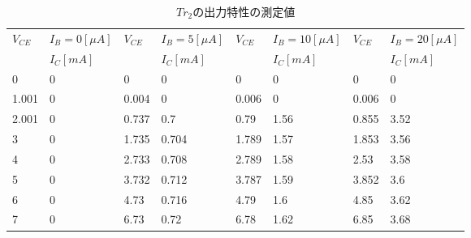 \documentclass[10pt, a4j, dvipdfmx]{jarticle}
\begin{document}
    \begin{table}[H]
        \centering
        \caption{$Tr_2$の出力特性の測定値}
        \label{tbl:5}
        \small
        \begin{tabular}{|l|l|l|l|l|l|l|l|}
        \hline
        \multirow{2}{*}{$V_{CE}$} & $I_B=0[\mu A]$ & \multirow{2}{*}{$V_{CE}$} & $I_B=5[\mu A]$ & \multirow{2}{*}{$V_{CE}$} & $I_B=10[\mu A]$ & \multirow{2}{*}{$V_{CE}$} & $I_B=20[\mu A]$ \\ \cline{2-2} \cline{4-4} \cline{6-6} \cline{8-8} 
        & $I_C[mA]$      &                           & $I_C[mA]$      &                           & $I_C[mA]$       &                           & $I_C[mA]$       \\ \hline            
        0                         & 0              & 0                         & 0              & 0                         & 0               & 0                         & 0               \\ \hline
        1.001                     & 0              & 0.004                     & 0              & 0.006                     & 0               & 0.006                     & 0               \\ \hline
        2.001                     & 0              & 0.737                     & 0.7            & 0.79                      & 1.56            & 0.855                     & 3.52            \\ \hline
        3                         & 0              & 1.735                     & 0.704          & 1.789                     & 1.57            & 1.853                     & 3.56            \\ \hline
        4                         & 0              & 2.733                     & 0.708          & 2.789                     & 1.58            & 2.53                      & 3.58            \\ \hline
        5                         & 0              & 3.732                     & 0.712          & 3.787                     & 1.59            & 3.852                     & 3.6             \\ \hline
        6                         & 0              & 4.73                      & 0.716          & 4.79                      & 1.6             & 4.85                      & 3.62            \\ \hline
        7                         & 0              & 6.73                      & 0.72           & 6.78                      & 1.62            & 6.85                      & 3.68            \\ \hline

\end{tabular}
\end{table}
\end{document}
